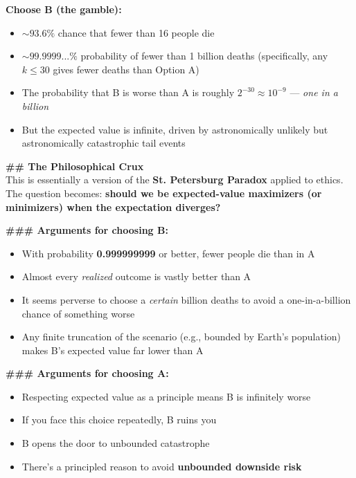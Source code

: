 \documentclass[11pt, a4paper]{article}
\begin{document}
{{        \textbf{Choose B (the gamble):}
        \begin{itemize}[nosep]
            \item $\sim 93.6\%$ chance that fewer than 16 people die
            \item $\sim 99.9999...\%$ probability of fewer than 1 billion deaths (specifically, any $k \le 30$ gives fewer deaths than Option A)
            \item The probability that B is worse than A is roughly $2^{-30} \approx 10^{-9}$ — \textit{one in a billion}
            \item But the expected value is infinite, driven by astronomically unlikely but astronomically catastrophic tail events
        \end{itemize}
        
        \textbf{\#\# The Philosophical Crux}\\
        This is essentially a version of the \textbf{St. Petersburg Paradox} applied to ethics. The question becomes: \textbf{should we be expected-value maximizers (or minimizers) when the expectation diverges?}
        
        \textbf{\#\#\# Arguments for choosing B:}
        \begin{itemize}[nosep]
            \item With probability \textbf{0.999999999} or better, fewer people die than in A
            \item Almost every \textit{realized} outcome is vastly better than A
            \item It seems perverse to choose a \textit{certain} billion deaths to avoid a one-in-a-billion chance of something worse
            \item Any finite truncation of the scenario (e.g., bounded by Earth's population) makes B's expected value far lower than A
        \end{itemize}
        
        \textbf{\#\#\# Arguments for choosing A:}
        \begin{itemize}[nosep]
            \item Respecting expected value as a principle means B is infinitely worse
            \item If you face this choice repeatedly, B ruins you
            \item B opens the door to unbounded catastrophe
            \item There's a principled reason to avoid \textbf{unbounded downside risk}
        \end{itemize}
        
}}
\end{document}
